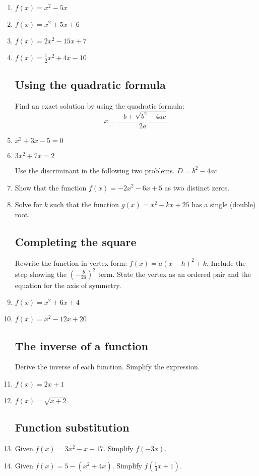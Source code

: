 \documentclass[]{book}
\begin{document}
\begin{enumerate}

\item   $f(x)=x^2-5x$
\item   $f(x)=x^2+5x+6$
\item   $f(x)=2x^2-15x+7$
\item   $f(x)=\frac{1}{2}x^2+4x-10$

\subsection*{Using the quadratic formula}

Find an exact solution by using the quadratic formula: 
\[x=\frac{-b \pm \sqrt{b^2-4ac}}{2a}\]
\item   $x^2+3x-5=0$
\item   $3x^2+7x = 2$

Use the discriminant in the following two problems. $D=b^2-4ac$ 
\item Show that the function $f(x)=-2x^2-6x+5$ as two distinct zeros.
\item Solve for $k$ such that the function $g(x)=x^2-kx+25$ has a single (double) root.

\subsection*{Completing the square}

Rewrite the function in vertex form: $f(x)=a(x-h)^2+k$. Include the step showing the $(-\frac{b}{2a})^2$ term. State the vertex as an ordered pair and the equation for the axis of symmetry.
\item   $f(x)=x^2+6x+4$
\item   $f(x)=x^2-12x+20$

\subsection*{The inverse of a function}
Derive the inverse of each function. Simplify the expression.
\item   $f(x)=2x+1$
\item   $f(x)=\sqrt{x+2}$

\subsection*{Function substitution}
\item Given $f(x)=3x^2-x+17$. Simplify $f(-3x)$.
\item Given $f(x)=5-(x^2+4x)$. Simplify $f(\frac{1}{3}x+1)$.


\end{enumerate}
\end{document}
